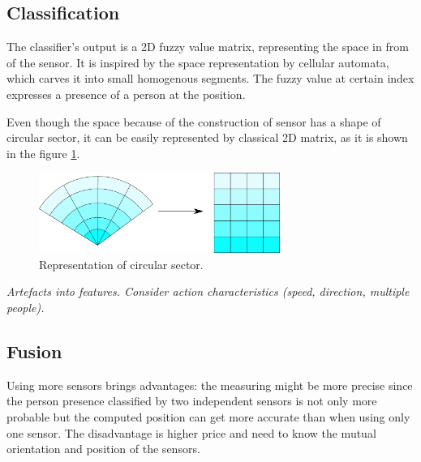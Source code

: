 \subsection*{Classification}
The classifier's output is a 2D fuzzy value matrix, representing the space in from of the sensor.
It is inspired by the space representation by cellular automata, which carves it into small
homogenous segments. The fuzzy value at certain index expresses a presence of a person
at the position.

Even though the space because of the construction of sensor has a shape of circular sector,
it can be easily represented by classical 2D matrix, as it is shown in the figure \ref{fig:circularsector}.

\begin{figure}[h!]
\begin{center}
\includegraphics[width=0.7\textwidth]{obrazky-figures/circularsector_transformation.png}
\caption{Representation of circular sector.\label{fig:circularsector}}
\end{center}
\end{figure}


{\it Artefacts into features. Consider action characteristics (speed, direction, multiple people).}

\subsection*{Fusion}
Using more sensors brings advantages: the measuring might be more precise since the person presence
classified by two independent sensors is not only more probable but the computed position
can get more accurate than when using only one sensor. The disadvantage is higher price and need
to know the mutual orientation and position of the sensors. 



